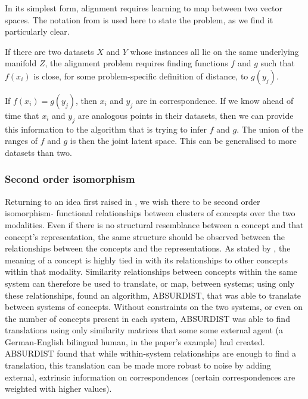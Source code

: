 In its simplest form, alignment requires learning to map between two vector spaces. 
The notation from \cite{ManifoldLearningTheoryAndApplications} is used here to state the problem, as we find it particularly clear.

If there are two datasets $X$ and $Y$ whose instances all lie on the same underlying manifold $Z$, the alignment problem requires finding functions $f$ and $g$ such that $f(x_i)$ is close, for some problem-specific definition of distance, to $g(y_j)$.


If $f(x_i) = g(y_j)$, then $x_i$ and $y_j$ are in correspondence. If we know ahead of time that $x_i$ and $y_j$ are analogous points in their datasets, then we can provide this information to the algorithm that is trying to infer $f$ and $g$. The union of the ranges of $f$ and $g$ is then the joint latent space. This can be generalised to more datasets than two. 

\subsubsection{Second order isomorphism}

Returning to an idea first raised in \cite{SHEPARD19701}, we wish there to be second order isomorphism- functional relationships between clusters of concepts over the two modalities. Even if there is no structural resemblance between a concept and that concept's representation, the same structure should be observed between the relationships between the concepts  and the representations. As stated by \cite{GOLDSTONE2002295}, the meaning of a concept is highly tied in with its relationships to other concepts within that modality. Similarity relationships between concepts within the same system can therefore be used to translate, or map, between systems; using only these relationships, \cite{GOLDSTONE2002295} found an algorithm, ABSURDIST, that was able to translate between systems of concepts. Without constraints on the two systems, or even on the number of concepts present in each system, ABSURDIST was able to find translations using only similarity matrices that some some external agent (a German-English bilingual human, in the paper's example) had created. ABSURDIST found that while within-system relationships are enough to find a translation, this translation can be made more robust to noise by adding external, extrinsic information on correspondences (certain correspondences are weighted with higher values). 

